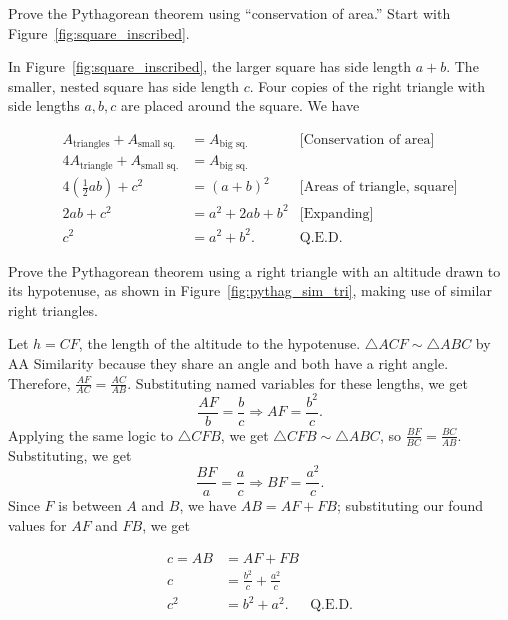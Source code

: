 \documentclass[../gatm_answers.tex]{subfiles}
\begin{document}
\begin{outer_problem}
\item Prove the Pythagorean theorem using ``conservation of area.'' Start with Figure~\ref{fig:square_inscribed}.
\end{outer_problem}

In Figure~\ref{fig:square_inscribed}, the larger square has side length $a+b$. The smaller, nested square has side length $c$. Four copies of the right triangle with side lengths $a,b,c$ are placed around the square. We have

\begin{align*}
A_{\text{triangles}} + A_{\text{small sq.}} &= A_{\text{big sq.}} & \text{[Conservation of area]} \\
4A_{\text{triangle}} + A_{\text{small sq.}} &= A_{\text{big sq.}} \\
4\left(\frac{1}{2}ab\right) + c^2 &= (a+b)^2 & \text{[Areas of triangle, square]} \\
2ab + c^2 &= a^2+2ab+b^2 & \text{[Expanding]} \\
c^2 &= a^2+b^2. & \text{Q.E.D.}
\end{align*}

\begin{outer_problem}
\item Prove the Pythagorean theorem using a right triangle with an altitude drawn to its hypotenuse, as shown in Figure~\ref{fig:pythag_sim_tri}, making use of similar right triangles.
\end{outer_problem}

Let $h=CF$, the length of the altitude to the hypotenuse. $\triangle ACF\sim \triangle ABC$ by AA Similarity because they share an angle and both have a right angle. Therefore, $\frac{AF}{AC}=\frac{AC}{AB}$. Substituting named variables for these lengths, we get $$\frac{AF}{b}=\frac{b}{c}\Longrightarrow AF = \frac{b^2}{c}.$$ Applying the same logic to $\triangle CFB$,
 we get $\triangle CFB\sim \triangle ABC$, so $\frac{BF}{BC}=\frac{BC}{AB}.$ Substituting, we get $$\frac{BF}{a}=\frac{a}{c} \Longrightarrow BF=\frac{a^2}{c}.$$ Since $F$ is between $A$ and $B$, we have $AB=AF+FB$; substituting our found values for $AF$ and $FB$, we get

\begin{align*}
c=AB &= AF+FB \\
c &= \frac{b^2}{c}+\frac{a^2}{c} \\
c^2 &= b^2 + a^2. & \text{Q.E.D.}
\end{align*}
\end{document}
